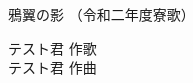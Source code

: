 \documentclass[10pt,b5j]{tarticle} %
\begin{document}
\begin{minipage}[c]{0.7\hsize} %
    \begin{center}
        {\LARGE
            鴉翼の影 %
        }
        {\small 
            （令和二年度寮歌） %
        }
    \end{center}
\end{minipage}
\begin{minipage}[c]{0.3\hsize} %
    \begin{flushright} %
        テスト君 作歌\\テスト君 作曲 %
    \end{flushright}
\end{minipage}
\end{document}
